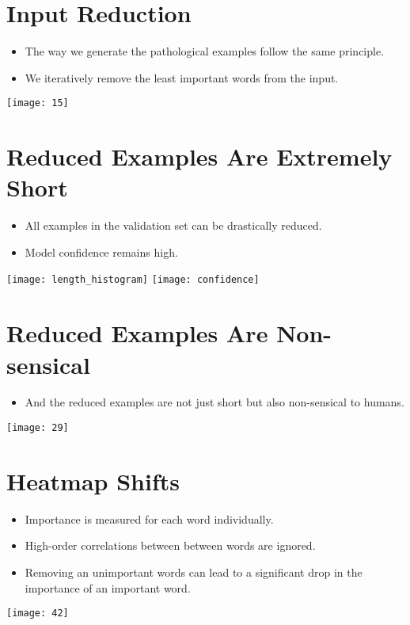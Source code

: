\documentclass[a0,portrait]{a0poster}
\begin{document}
\begin{multicols}{2}
\section*{Input Reduction}
\begin{itemize}
\item The way we generate the pathological examples follow the same principle.
\item We iteratively remove the least important words from the input.
\end{itemize}
\vspace{0.3cm}
\begin{center}
\texttt{[image: 15]}
\end{center}


\section*{Reduced Examples Are Extremely Short}
\begin{itemize}
\item All examples in the validation set can be drastically reduced.
\item Model confidence remains high.
\end{itemize}
\begin{center}
\texttt{[image: length\_histogram]}
\texttt{[image: confidence]}
\end{center}

\section*{Reduced Examples Are Non-sensical}
\begin{itemize}
\item And the reduced examples are not just short but also non-sensical to humans.
\end{itemize}
\begin{center}
\texttt{[image: 29]}
\end{center}

\section*{Heatmap Shifts}
\begin{itemize}
\item Importance is measured for each word individually.
\item High-order correlations between between words are ignored.
\item Removing an unimportant words can lead to a significant drop in the
    importance of an important word.
\end{itemize}
\begin{center}
\texttt{[image: 42]}
\end{center}


\end{multicols}
\end{document}
